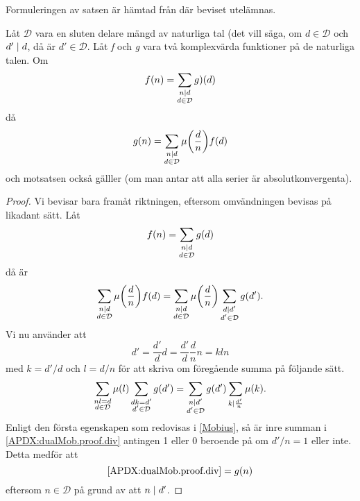 Formuleringen av satsen är hämtad från \cite[Sats 1.2.3]{cojocarumurty} där beviset utelämnas.
\begin{theorem}\label{APDX:mobDual}
Låt \(\mathcal{D}\) vara en sluten delare mängd av naturliga tal (det vill säga, om \(d \in \mathcal{D}\) och \(d'\mid d\), då är \(d'\in \mathcal{D}\). Låt \textit{f} och \textit{g} vara två komplexvärda funktioner på de naturliga talen. Om
\begin{equation}
    f(n)=\sum_{\substack{n\mid d\\d\in \mathcal{D}}}g)(d)\nonumber
\end{equation}
då
\begin{equation}
    g(n) = \sum_{\substack{n\mid d\\d\in \mathcal{D}}}\mu\bigg(\frac{d}{n}\bigg)f(d)\nonumber
\end{equation}
och motsatsen också gälller (om man antar att alla serier är absolutkonvergenta).
\end{theorem}
\begin{proof}
Vi bevisar bara framåt riktningen, eftersom omvändningen  bevisas  på likadant sätt. Låt
\begin{equation}
    f(n)=\sum_{\substack{n\mid d\\d\in \mathcal{D}}}g(d)\nonumber
\end{equation}
då är
\begin{equation}
    \sum_{\substack{n\mid d\\d\in \mathcal{D}}}\mu\bigg(\frac{d}{n}\bigg)f(d) = \sum_{\substack{n\mid d\\d\in \mathcal{D}}}\mu\bigg(\frac{d}{n}\bigg)\sum_{\substack{d\mid d'\\d'\in \mathcal{D}}}g(d').\nonumber
\end{equation}
Vi nu använder att
\begin{equation}
    d' = \frac{d'}{d}d = \frac{d'}{d}\frac{d}{n}n = kln\nonumber
\end{equation}
med \(k = d'/d\) och \(l = d/n\) för att skriva om föregående summa på följande sätt.
\begin{equation}
    \sum_{\substack{nl = d\\d\in \mathcal{D}}}\mu(l)\sum_{\substack{dk= d'\\d'\in \mathcal{D}}}g(d') = \sum_{\substack{n \mid d'\\d'\in \mathcal{D}}}g(d')\sum_{k\mid \frac{d'}{n}}\mu(k).\label{APDX:dualMob.proof.div}
\end{equation}
Enligt den första egenskapen som redovisas i \ref{Mobius}, så är inre summan i \eqref{APDX:dualMob.proof.div} antingen 1 eller 0 beroende på om \(d'/n = 1\) eller inte. Detta medför att
\begin{equation}
    \eqref{APDX:dualMob.proof.div} = g(n)\nonumber
\end{equation}
eftersom \(n \in \mathcal{D}\) på grund av att \(n \mid d'\).
\end{proof}